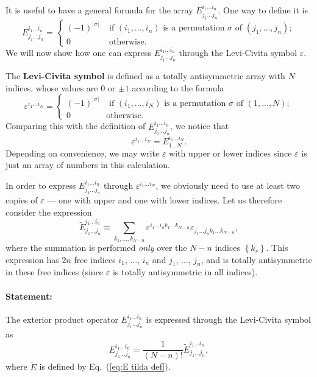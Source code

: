 It is useful to have a general formula for the array $E_{j_{1}...j_{n}}^{i_{1}...i_{n}}$.
One way to define it is\[
E_{j_{1}...j_{n}}^{i_{1}...i_{n}}=\begin{cases}
\left(-1\right)^{\left|\sigma\right|} & \text{ if }\left(i_{1},...,i_{n}\right)\text{ is a permutation }\sigma\text{ of }\left(j_{1},...,j_{n}\right);\\
0 & \text{ otherwise}.\end{cases}\]
We will now show how one can express $E_{j_{1}...j_{n}}^{i_{1}...i_{n}}$
through the Levi-Civita symbol $\varepsilon$.

The \textbf{Levi-Civita symbol} is defined
as a totally antisymmetric array with $N$ indices, whose values are
$0$ or $\pm1$ according to the formula \[
\varepsilon^{i_{1}...i_{N}}=\begin{cases}
\left(-1\right)^{\left|\sigma\right|} & \text{ if }\left(i_{1},...,i_{N}\right)\text{ is a permutation }\sigma\text{ of }\left(1,...,N\right);\\
0 & \text{otherwise.}\end{cases}\]
Comparing this with the definition of $E_{j_{1}...j_{n}}^{i_{1}...i_{n}}$,
we notice that\[
\varepsilon^{i_{1}...i_{N}}=E_{1...N}^{i_{1}...i_{N}}.\]
Depending on convenience, we may write $\varepsilon$ with upper or
lower indices since $\varepsilon$ is just an array of numbers in
this calculation. 

In order to express $E_{j_{1}...j_{n}}^{i_{1}...i_{n}}$ through $\varepsilon^{i_{1}...i_{N}}$,
we obviously need to use at least two copies of $\varepsilon$ ---
one with upper and one with lower indices. Let us therefore consider
the expression\begin{equation}
\tilde{E}_{j_{1}...j_{n}}^{i_{1}...i_{n}}\equiv\sum_{k_{1},...,k_{N-n}}\varepsilon^{i_{1}...i_{n}k_{1}...k_{N-n}}\varepsilon_{j_{1}...j_{n}k_{1}...k_{N-n}},\label{eq:E tilda def}\end{equation}
where the summation is performed \emph{only} over the $N-n$ indices
$\left\{ k_{s}\right\} $. This expression has $2n$ free indices
$i_{1}$, ..., $i_{n}$ and $j_{1}$, ..., $j_{n}$, and is totally
antisymmetric in these free indices (since $\varepsilon$ is totally
antisymmetric in all indices). 


\paragraph{Statement:}

The exterior product operator $E_{j_{1}...j_{n}}^{i_{1}...i_{n}}$
is expressed through the Levi-Civita symbol as\begin{equation}
E_{j_{1}...j_{n}}^{i_{1}...i_{n}}=\frac{1}{\left(N-n\right)!}\tilde{E}_{j_{1}...j_{n}}^{i_{1}...i_{n}},\label{eq:E def}\end{equation}
where $\tilde{E}$ is defined by Eq.~(\ref{eq:E tilda def}).


